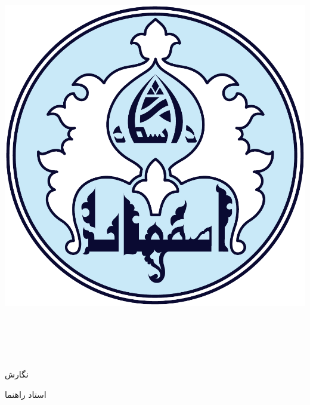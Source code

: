 
\begin{center}

\includegraphics[scale=0.2]{./assets/logo.pdf}

\vspace{0.5cm}
\ThesisUniversity \\[-0.3em]
\vspace{0.5cm}
\ThesisDepartment\\

\begin{large}
\vspace{0.5cm}



\end{large}

\vspace{1.5cm}

{\LARGE\textbf{\ThesisTitle}}\\ 
\vspace{0.5cm}
\begin{latin}
{\Large\textbf\EnglishThesisTitle}
\end{latin}

\vspace{2cm}

{نگارش}\\[.5em]
{\large\textbf{\ThesisAuthor}}

\vspace{1.5cm}

{استاد راهنما}\\[.5em]
{\large\textbf{\ThesisSupervisor}}

\vspace{1cm}



\vspace{2cm}

\ThesisDate

\end{center}

\newpage
